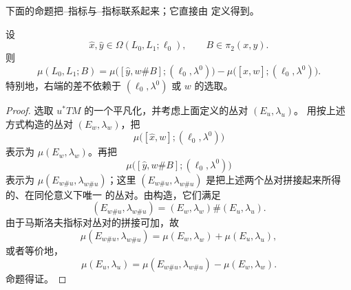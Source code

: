 下面的命题把\personMaslov{}--\personMorse{}指标与\personMaslov{}--\personViterbo{}指标联系起来；它直接由
定义得到。

\begin{proposition}
\label{prop:maslov-morse-viterbo-difference}
设
\[
  \widehat x,\widehat y\in\Omega(L_0,L_1;\ell_0),
  \qquad
  B\in\pi_2(x,y).
\]
则
\[
  \mu(L_0,L_1;B)
  =\mu\bigl([\widehat y,w\#B];(\ell_0,\lambda^0)\bigr)
   -\mu\bigl([\widehat x,w];(\ell_0,\lambda^0)\bigr).
\]
特别地，右端的差不依赖于 $(\ell_0,\lambda^0)$ 或 $w$ 的选取。
\end{proposition}

\begin{proof}
选取 $u^*TM$ 的一个平凡化，并考虑上面定义的丛对 $(E_u,\lambda_u)$。
用按上述方式构造的丛对 $(E_w,\lambda_w)$，把
\[
  \mu\bigl([\widehat x,w];(\ell_0,\lambda^0)\bigr)
\]
表示为 $\mu(E_w,\lambda_w)$。再把
\[
  \mu\bigl([\widehat y,w\#B];(\ell_0,\lambda^0)\bigr)
\]
表示为 $\mu(E_{w\#u},\lambda_{w\#u})$；这里
$(E_{w\#u},\lambda_{w\#u})$ 是把上述两个丛对拼接起来所得的、在同伦意义下唯一
的丛对。由构造，它们满足
\[
  (E_{w\#u},\lambda_{w\#u})
  =(E_w,\lambda_w)\#(E_u,\lambda_u).
\]
由于马斯洛夫指标对丛对的拼接可加，故
\[
  \mu(E_{w\#u},\lambda_{w\#u})
  =\mu(E_w,\lambda_w)+\mu(E_u,\lambda_u),
\]
或者等价地，
\[
  \mu(E_u,\lambda_u)
  =\mu(E_{w\#u},\lambda_{w\#u})-\mu(E_w,\lambda_w).
\]
命题得证。
\end{proof}
